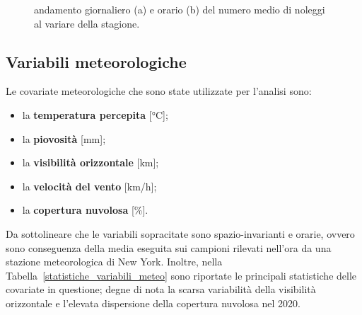 \begin{figure}[htpb]
	\centering
	\quad
	\quad
	\caption[Andamento giornaliero e orario del numero medio di noleggi al variare della stagione]{andamento giornaliero (a) e orario (b) del numero medio di noleggi al variare della stagione.}
	\label{ritiri_giornalieri_orari}
\end{figure}

\subsection[Variabili meteorologiche]{Variabili meteorologiche}
Le covariate meteorologiche che sono state utilizzate per l'analisi sono:
\begin{itemize}
	\item la \textbf{temperatura percepita}  [\unit{\degreeCelsius}];
	\item la \textbf{piovosità} [\unit{\milli\meter}];
	\item la \textbf{visibilità orizzontale} [\unit{\kilo\meter}];
	\item la \textbf{velocità del vento} [\unit{\kilo\meter/\hour}];
	\item la \textbf{copertura nuvolosa} [\unit{\percent}].
\end{itemize}
Da sottolineare che le variabili sopracitate sono spazio-invarianti e orarie, ovvero sono conseguenza della media eseguita sui campioni rilevati nell'ora da una stazione meteorologica di New York. Inoltre, nella Tabella~\ref{statistiche_variabili_meteo} sono riportate le principali statistiche delle covariate in questione; degne di nota la scarsa variabilità della visibilità orizzontale e l'elevata dispersione della copertura nuvolosa nel \num{2020}.

